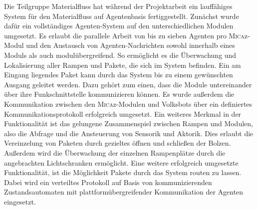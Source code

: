 Die Teilgruppe Materialfluss hat während der Projektarbeit ein lauffähiges System für den Materialfluss auf Agentenbasis fertiggestellt. Zunächst wurde dafür ein vollständiges Agenten-System auf den unterschiedlichen Modulen umgesetzt. Es erlaubt die parallele Arbeit von bis zu sieben Agenten pro \textsc{Mica}z-Modul und den Austausch von Agenten-Nachrichten sowohl innerhalb eines Moduls als auch modulübergreifend. So ermöglicht es die Überwachung und Lokalisierung aller Rampen und Pakete, die sich im System befinden. Ein am Eingang liegendes Paket kann durch das System bis zu einem gewünschten Ausgang geleitet werden. Dazu gehört zum einen, dass die Module untereinander über ihre Funkschnittstelle kommunizieren können. Es wurde außerdem die Kommunikation zwischen den \textsc{Mica}z-Modulen und Volksbots über ein definiertes Kommunikationsprotokoll erfolgreich umgesetzt. Ein weiteres Merkmal in der Funktionalität ist das gelungene Zusammenspiel zwischen Rampen und Modulen, also die Abfrage und die Ansteuerung von Sensorik und Aktorik. Dies erlaubt die Vereinzelung von Paketen durch gezieltes öffnen und schließen der Bolzen. Außerdem wird die Überwachung der einzelnen Rampenplätze durch die angebrachten Lichtschranken ermöglicht. Eine weitere erfolgreich umgesetzte Funktionalität, ist die Möglichkeit Pakete durch das System routen zu lassen. Dabei wird ein verteiltes Protokoll auf Basis von kommunizierenden Zustandsautomaten mit plattformübergreifender Kommunikation der Agenten eingesetzt.


